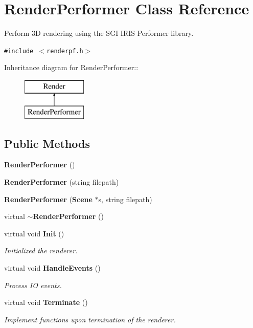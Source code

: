 \section{Render\-Performer  Class Reference}
\label{class_RenderPerformer}
Perform 3D rendering using the SGI IRIS Performer library. 


{\tt \#include $<$renderpf.h$>$}

Inheritance diagram for Render\-Performer::\begin{figure}[H]
\begin{center}
\leavevmode
\includegraphics[height=2cm]{class_RenderPerformer}
\end{center}
\end{figure}
\subsection*{Public Methods}
\begin{CompactItemize}
\item 
{\bf Render\-Performer} ()
\item 
{\bf Render\-Performer} (string filepath)
\item 
{\bf Render\-Performer} ({\bf Scene} $\ast$s, string filepath)
\item 
virtual {\bf $\sim$Render\-Performer} ()
\item 
virtual void {\bf Init} ()
\begin{CompactList}\small\item\em Initialized the renderer.\item\end{CompactList}\item 
virtual void {\bf Handle\-Events} ()
\begin{CompactList}\small\item\em Process IO events.\item\end{CompactList}\item 
virtual void {\bf Terminate} ()
\begin{CompactList}\small\item\em Implement functions upon termination of the renderer.\item\end{CompactList}\end{CompactItemize}
